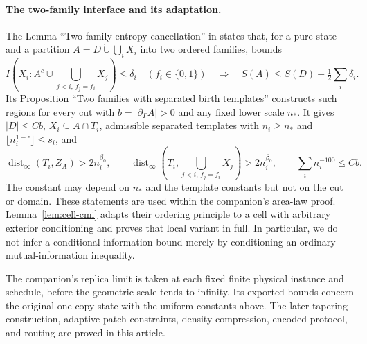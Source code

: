 \documentclass[11pt]{article}
\numberwithin{equation}{section}
\theoremstyle{definition}
\theoremstyle{remark}
\begin{document}
\paragraph{The two-family interface and its adaptation.}
The Lemma ``Two-family entropy cancellation'' in
\cite[Section~11]{RepoAreaLaw} states that, for a pure state and a partition
$A=D\mathbin{\dot\cup}\bigcup_iX_i$ into two ordered families, bounds
\[
 I\left(X_i:A^c\cup\bigcup_{j<i,\,f_j=f_i}X_j\right)\le\delta_i
 \quad(f_i\in\{0,1\})
 \quad\Longrightarrow\quad
 S(A)\le S(D)+\tfrac12\sum_i\delta_i.
\]
Its Proposition ``Two families with separated birth templates'' constructs
such regions for every cut with $b=|\partial_\Gamma A|>0$ and any fixed lower
scale $n_*$. It gives $|D|\le Cb$, $X_i\subseteq A\cap T_i$, admissible
separated templates with $n_i\ge n_*$ and
$\lfloor n_i^{1-\epsilon}\rfloor\le s_i$, and
\[
 \operatorname{dist}_\infty(T_i,Z_A)>2n_i^{\beta_0},\qquad
 \operatorname{dist}_\infty\left(T_i,\bigcup_{j<i,\,f_j=f_i}X_j\right)>2n_i^{\beta_0},
 \qquad \sum_i n_i^{-100}\le Cb.
\]
The constant may depend on $n_*$ and the template constants but not on the
cut or domain. These statements are used within the companion's area-law
proof. Lemma~\ref{lem:cell-cmi} adapts their ordering principle to a cell
with arbitrary exterior conditioning and proves that local variant in
full. In particular, we do not infer a conditional-information bound merely
by conditioning an ordinary mutual-information inequality.

The companion's replica limit is taken at each fixed finite physical
instance and schedule, before the geometric scale tends to infinity.
Its exported bounds concern the original one-copy state with the uniform
constants above. The later tapering construction, adaptive patch
constraints, density compression, encoded protocol, and routing are proved
in this article.

\begingroup
\small
\let\originalthebibliography\thebibliography
\renewcommand{\thebibliography}[1]{
  \originalthebibliography{#1}
  \addcontentsline{toc}{section}{\refname}
}


\endgroup
\end{document}

